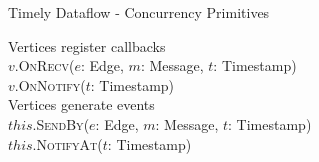 \begin{frame}[t]{Timely Dataflow - Concurrency Primitives}

  \vspace{0.5cm}
  \begin{center}
  \end{center}

  \vspace{0.5cm}
  Vertices register callbacks \\
  \vspace{0.25cm}
  $v$.\textsc{OnRecv}($e$: Edge, $m$: Message, $t$: Timestamp) \\
  $v$.\textsc{OnNotify}($t$: Timestamp) \\

  \vspace{0.75cm}
  Vertices generate events \\
  \vspace{0.25cm}
  $this$.\textsc{SendBy}($e$: Edge, $m$: Message, $t$: Timestamp) \\
  $this$.\textsc{NotifyAt}($t$: Timestamp) \\

\end{frame}

